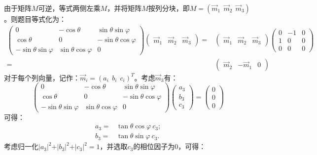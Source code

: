 \documentclass[reqno,a4paper,12pt]{amsart}
\begin{document}
\begin{tcolorbox}[breakable, colback = black!5!white, colframe = black]
由于矩阵$M$可逆，等式两侧左乘$M$，并将矩阵$M$按列分块，即$M = (\vec{m}_1 ~~ \vec{m}_2 ~~ \vec{m}_3)$。则题目等式化为：
\begin{align*}
	\left(
	\begin{matrix}
		0 & -\cos\theta & \sin\theta\sin\varphi \\
		\cos\theta & 0 & -\sin\theta\cos\varphi \\
		-\sin\theta\sin\varphi & \sin\theta\cos\varphi & 0
	\end{matrix}
	\right)
	\left(
	\begin{matrix}
		\vec{m}_1 & \vec{m}_2 & \vec{m}_3
	\end{matrix}
	\right)
	=&
	\left(
	\begin{matrix}
		\vec{m}_1 & \vec{m}_2 & \vec{m}_3
	\end{matrix}
	\right)
	\left(
	\begin{matrix}
		0 & -1 & 0 \\
		1 & 0 & 0 \\
		0 & 0 & 0
	\end{matrix}
	\right) \\
	=&
	\left(
	\begin{matrix}
		\vec{m}_2 & -\vec{m}_1 & 0
	\end{matrix}
	\right)
\end{align*}
对于每个列向量，记作：$\vec{m}_i = (a_i ~~ b_i ~~ c_i)^T$。考虑$\vec{m}_3$有：
\[
	\left(
	\begin{matrix}
		0 & -\cos\theta & \sin\theta\sin\varphi \\
		\cos\theta & 0 & -\sin\theta\cos\varphi \\
		-\sin\theta\sin\varphi & \sin\theta\cos\varphi & 0
	\end{matrix}
	\right)
	\left(
	\begin{matrix}
		a_3 \\
		b_3 \\ 
		c_3
	\end{matrix}
	\right)
	=
	\left(
	\begin{matrix}
		0 \\ 
		0 \\ 
		0
	\end{matrix}
	\right)
\]
可得：
\begin{align*}
	a_3=& \tan\theta\cos\varphi ~ c_3; \\
	b_3=& \tan\theta\sin\varphi ~ c_3.
\end{align*}
考虑归一化$\vert a_3 \vert^2 + \vert b_3 \vert^2 + \vert c_3 \vert^2 = 1$，并选取$c_3$的相位因子为$0$，可得：

\end{tcolorbox}
\end{document}
